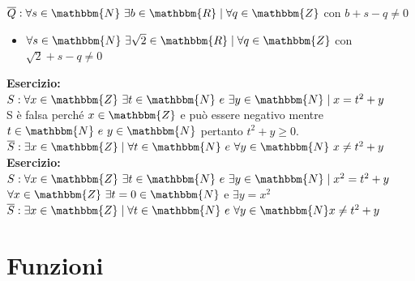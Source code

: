 \documentclass[12pt, letterpaper]{report}
\begin{document}
	$\overline Q: \forall s \in \mathbbm{N} \ \exists b \in \mathbbm{R} \mid \forall q \in \mathbbm{Z}$ con $b + s - q \not = 0$
	\begin{itemize}
		\item $\forall s \in \mathbbm{N} \ \exists \sqrt{2} \in \mathbbm{R} \mid \forall q \in \mathbbm{Z}$ con $\sqrt{2} + s - q \not = 0$
	\end{itemize}
	\textbf{Esercizio:} $S: \forall x \in \mathbbm{Z} \ \exists t \in \mathbbm{N} \ e \ \exists y \in \mathbbm{N} \mid x = t^2 + y$
	\\
	S è falsa perché $x \in \mathbbm{Z}$ e può essere negativo mentre $t \in \mathbbm{N} \ e \ y \in \mathbbm{N}$ pertanto $t^2 + y \geq 0$.
	\\
	$\overline S: \exists x \in \mathbbm{Z} \mid \forall t \in \mathbbm{N} \ e \ \forall y \in \mathbbm{N} \ x \not = t^2 + y$
	\\
	\textbf{Esercizio:} $S: \forall x \in \mathbbm{Z} \ \exists t \in \mathbbm{N} \ e \ \exists y \in \mathbbm{N} \mid x^2 = t^2 + y$
	\\
	$\forall x \in \mathbbm{Z} \ \exists t = 0 \in \mathbbm{N}$ e $\exists y = x^2$
	\\
	$\overline S: \exists x \in \mathbbm{Z} \mid \forall t \in \mathbbm{N} \ e \ \forall y \in \mathbbm{N} x \not = t^2 + y$
	\chapter{Funzioni}
\end{document}
